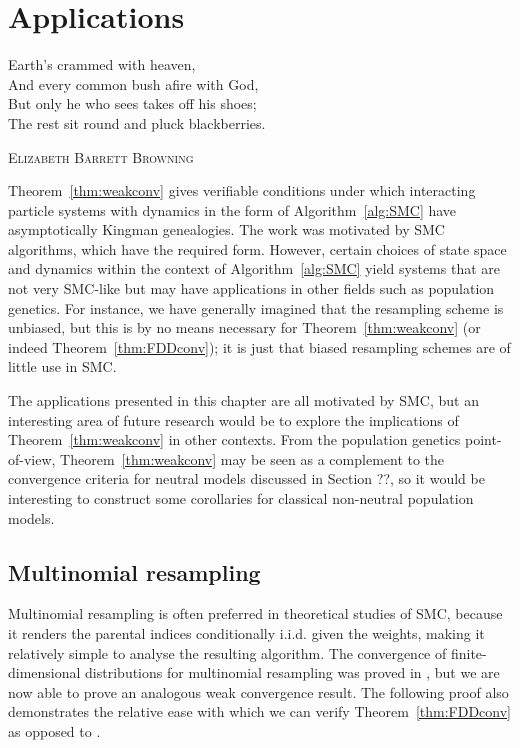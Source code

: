 \chapter{Applications \seb{$\checkmark$} }\label{ch:appl}

\epigraph{
Earth's crammed with heaven, \\
And every common bush afire with God, \\
But only he who sees takes off his shoes; \\
The rest sit round and pluck blackberries.
}
{\textsc{Elizabeth Barrett Browning}}


Theorem~\ref{thm:weakconv} gives verifiable conditions under which interacting particle systems with dynamics in the form of Algorithm~\ref{alg:SMC} have asymptotically Kingman genealogies. 
The work was motivated by SMC algorithms, which have the required form. However, certain choices of state space and dynamics within the context of Algorithm~\ref{alg:SMC} yield systems that are not very SMC-like but may have applications in other fields such as population genetics. 
For instance, we have generally imagined that the resampling scheme is unbiased, but this is by no means necessary for Theorem~\ref{thm:weakconv} (or indeed Theorem~\ref{thm:FDDconv}); it is just that biased resampling schemes are of little use in SMC.

The applications presented in this chapter are all motivated by SMC, but an interesting area of future research would be to explore the implications of Theorem~\ref{thm:weakconv} in other contexts. From the population genetics point-of-view, Theorem~\ref{thm:weakconv} may be seen as a complement to the convergence criteria for neutral models \parencite[e.g.][]{mohle2001} discussed in Section ??, so it would be interesting to construct some corollaries for classical non-neutral population models.


\section{Multinomial resampling}
\label{sec:corol_mn}
Multinomial resampling is often preferred in theoretical studies of SMC, because it renders the parental indices conditionally i.i.d. given the weights, making it relatively simple to analyse the resulting algorithm.
The convergence of finite-dimensional distributions for multinomial resampling was proved in \textcite[Corollary 1]{koskela2018}, but we are now able to prove an analogous weak convergence result. The following proof also demonstrates the relative ease with which we can verify Theorem~\ref{thm:FDDconv} as opposed to \textcite[Theorem 1]{koskela2018}.

